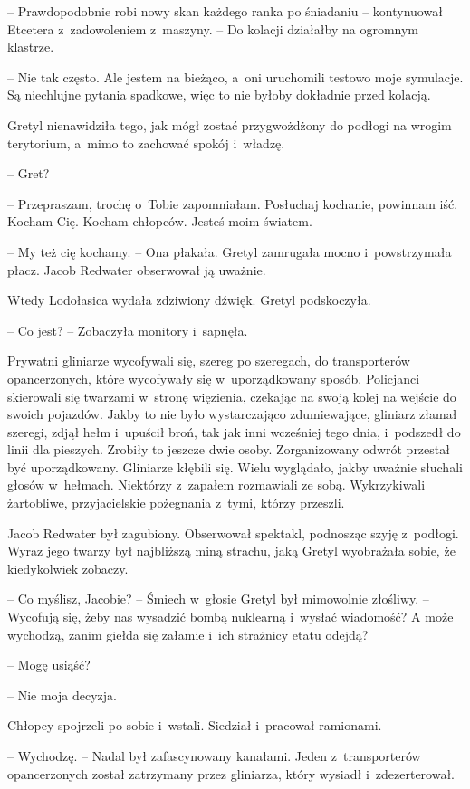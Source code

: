 \documentclass[oneside,polish,11pt,sfheadings]{mwbk}
\begin{document}
-- Prawdopodobnie robi nowy skan każdego ranka po śniadaniu -- kontynuował
Etcetera z~zadowoleniem z~maszyny. -- Do kolacji działałby na ogromnym
klastrze.

-- Nie tak często. Ale jestem na bieżąco, a~oni uruchomili testowo moje
symulacje. Są niechlujne pytania spadkowe, więc to nie byłoby dokładnie
przed kolacją.

Gretyl nienawidziła tego, jak mógł zostać przygwożdżony do podłogi na
wrogim terytorium, a~mimo to zachować spokój i~władzę.

-- Gret?

-- Przepraszam, trochę o~Tobie zapomniałam. Posłuchaj kochanie, powinnam
iść. Kocham Cię. Kocham chłopców. Jesteś moim światem.

-- My też cię kochamy. -- Ona płakała. Gretyl zamrugała mocno i~powstrzymała płacz. Jacob Redwater obserwował ją uważnie.

Wtedy Lodołasica wydała zdziwiony dźwięk. Gretyl podskoczyła. 

-- Co jest?
-- Zobaczyła monitory i~sapnęła.

Prywatni gliniarze wycofywali się, szereg po szeregach, do transporterów
opancerzonych, które wycofywały się w~uporządkowany sposób. Policjanci
skierowali się twarzami w~stronę więzienia, czekając na swoją kolej na
wejście do swoich pojazdów. Jakby to nie było wystarczająco
zdumiewające, gliniarz złamał szeregi, zdjął hełm i~upuścił broń, tak
jak inni wcześniej tego dnia, i~podszedł do linii dla pieszych. Zrobiły
to jeszcze dwie osoby. Zorganizowany odwrót przestał być uporządkowany.
Gliniarze kłębili się. Wielu wyglądało, jakby uważnie słuchali głosów w~hełmach. Niektórzy z~zapałem rozmawiali ze sobą. Wykrzykiwali
żartobliwe, przyjacielskie pożegnania z~tymi, którzy przeszli.

Jacob Redwater był zagubiony. Obserwował spektakl, podnosząc szyję z~podłogi. Wyraz jego twarzy był najbliższą miną strachu, jaką Gretyl
wyobrażała sobie, że kiedykolwiek zobaczy.

-- Co myślisz, Jacobie? -- Śmiech w~głosie Gretyl był mimowolnie złośliwy.
-- Wycofują się, żeby nas wysadzić bombą nuklearną i~wysłać wiadomość? A
może wychodzą, zanim giełda się załamie i~ich strażnicy etatu odejdą?

-- Mogę usiąść?

-- Nie moja decyzja.

Chłopcy spojrzeli po sobie i~wstali. Siedział i~pracował ramionami.

-- Wychodzę. -- Nadal był zafascynowany kanałami. Jeden z~transporterów
opancerzonych został zatrzymany przez gliniarza, który wysiadł i~zdezerterował.
\end{document}
